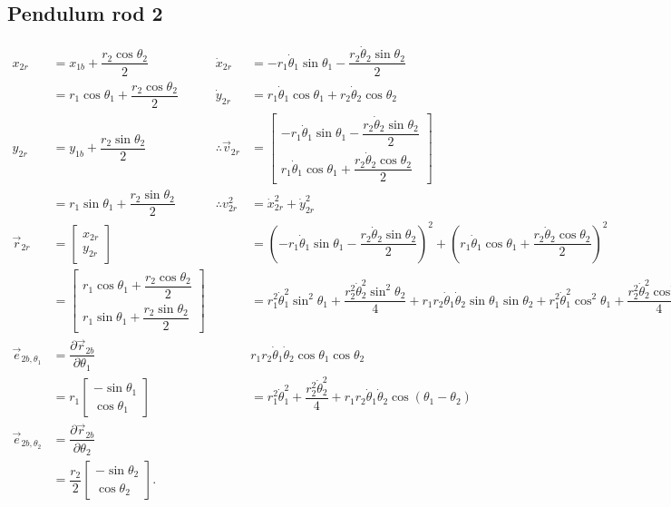 \documentclass[12pt,a4paper,portrait]{article}
\begin{document}
	\subsection{Pendulum rod 2}
	\begin{align*}
		x_{2r} &= x_{1b} + \dfrac{r_2 \cos{\theta_2}}{2} &\dot{x}_{2r} &= -r_1\dot{\theta}_1 \sin{\theta_1}-\dfrac{r_2\dot{\theta}_2 \sin{\theta_2}}{2}\\
		&= r_1 \cos{\theta_1} + \dfrac{r_2 \cos{\theta_2}}{2} & \dot{y}_{2r} &= r_1\dot{\theta}_1 \cos{\theta_1}+r_2\dot{\theta}_2 \cos{\theta_2} \\ 
		y_{2r} &= y_{1b} + \dfrac{r_2 \sin{\theta_2}}{2} & \therefore \vec{v}_{2r} &= \begin{bmatrix}
			-r_1\dot{\theta}_1 \sin{\theta_1}-\dfrac{r_2\dot{\theta}_2 \sin{\theta_2}}{2}\\
			r_1\dot{\theta}_1 \cos{\theta_1}+\dfrac{r_2\dot{\theta}_2 \cos{\theta_2}}{2}
		\end{bmatrix}\\
		&= r_1 \sin{\theta_1} + \dfrac{r_2 \sin{\theta_2}}{2} & \therefore v_{2r}^2 &= \dot{x}_{2r}^2 + \dot{y}_{2r}^2 \\
		\vec{r}_{2r}&= \begin{bmatrix}
			x_{2r} \\
			y_{2r}
		\end{bmatrix}& &= \left(-r_1\dot{\theta}_1 \sin{\theta_1}-\dfrac{r_2\dot{\theta}_2 \sin{\theta_2}}{2}\right)^2 + \left(r_1\dot{\theta}_1 \cos{\theta_1}+\dfrac{r_2\dot{\theta}_2 \cos{\theta_2}}{2}\right)^2 \\
		&= \begin{bmatrix}
			r_1 \cos{\theta_1} + \dfrac{r_2 \cos{\theta_2}}{2}\\
			r_1 \sin{\theta_1} + \dfrac{r_2 \sin{\theta_2}}{2}
		\end{bmatrix} & &= r_1^2 \dot{\theta}_1^2 \sin^2{\theta_1} + \dfrac{r_2^2 \dot{\theta}_2^2 \sin^2{\theta_2}}{4} + r_1 r_2 \dot{\theta}_1\dot{\theta}_2 \sin{\theta_1}\sin{\theta_2} + r_1^2 \dot{\theta}_1^2 \cos^2{\theta_1} + \dfrac{r_2^2 \dot{\theta}_2^2 \cos^2{\theta_2}}{4} + \\
		\vec{e}_{2b,\theta_1} &= \dfrac{\partial \vec{r}_{2b}}{\partial \theta_1} && r_1 r_2 \dot{\theta}_1 \dot{\theta}_2 \cos{\theta_1}\cos{\theta_2} \\
		&= r_1\begin{bmatrix}
			-\sin{\theta_1} \\
			\cos{\theta_1}
		\end{bmatrix}& &= r_1^2 \dot{\theta}_1^2 + \dfrac{r_2^2 \dot{\theta}_2^2}{4} + r_1 r_2 \dot{\theta}_1 \dot{\theta}_2 \cos{\left(\theta_1-\theta_2\right)}\\
		\vec{e}_{2b,\theta_2} &= \dfrac{\partial \vec{r}_{2b}}{\partial \theta_2} \\
		&= \dfrac{r_2}{2} \begin{bmatrix}
			-\sin{\theta_2} \\
			\cos{\theta_2}
		\end{bmatrix}.
	\end{align*}
	 
\end{document}
